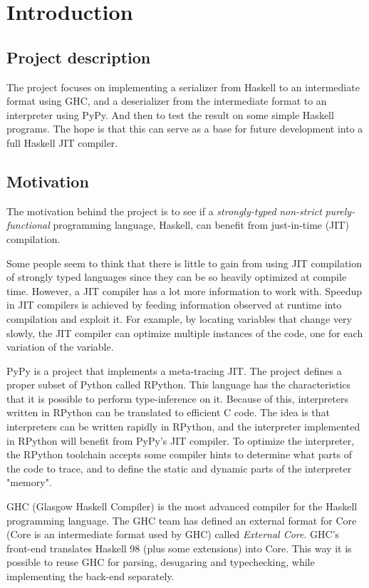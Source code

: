 
\section{Introduction}

\subsection{Project description}

The project focuses on implementing a serializer from Haskell to an intermediate
format using GHC, and a deserializer from the intermediate format to an
interpreter using PyPy. And then to test the result on some simple Haskell
programs. The hope is that this can serve as a base for future development
into a full Haskell JIT compiler.

\subsection{Motivation}

The motivation behind the project is to see if a \emph{strongly-typed} 
\emph{non-strict} \emph{purely-functional} programming language, Haskell, 
can benefit from just-in-time (JIT) compilation.

Some people seem to think that there is little to gain from using 
JIT compilation of strongly typed languages since they can be
so heavily optimized at compile time. However, a JIT compiler has a lot
more information to work with. Speedup in JIT compilers is achieved by
feeding information observed at runtime into compilation and exploit it.
For example, by locating variables that change very slowly, the JIT compiler can
optimize multiple instances of the code, one for each variation of the
variable. \cite{bolz2011runtime}

PyPy is a project that implements a meta-tracing JIT. The project
defines a proper subset of Python called RPython. This language has 
the characteristics that it is possible to perform type-inference on it.
Because of this, interpreters written in RPython can be translated to
efficient C code.
The idea is that interpreters can be written rapidly in RPython, and the
interpreter implemented in RPython will benefit from PyPy's JIT compiler.
To optimize the interpreter, the RPython toolchain accepts some compiler
hints to determine what parts of the code to trace, and to define the 
static and dynamic parts of the interpreter "memory". \cite{bolz2011runtime}

GHC (Glasgow Haskell Compiler) is the most advanced compiler for the
Haskell programming language. The GHC team has defined an external format
for Core (Core is an intermediate format used by GHC) called \emph{External Core}. 
GHC's front-end translates Haskell 98 (plus some extensions) into Core. 
This way it is possible to reuse GHC for parsing, desugaring and typechecking, 
while implementing the back-end separately. \cite{tolmach2010ghc}

